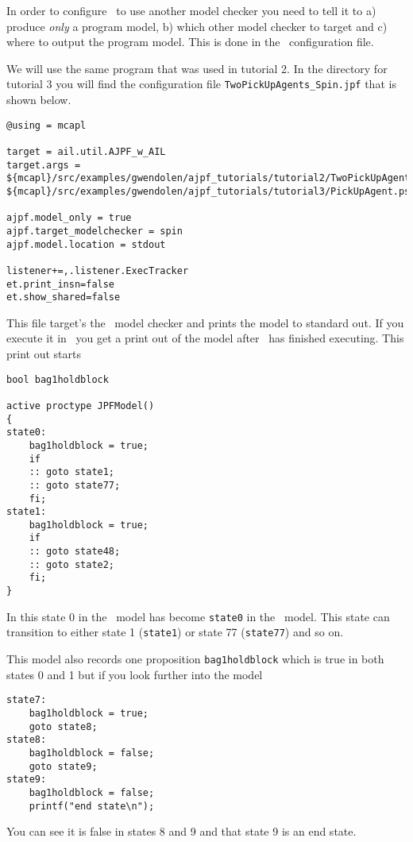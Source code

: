 \documentclass[a4]{article}
\begin{document}
In order to configure \ajpf\ to use another model checker you need to tell it to a) produce \emph{only} a program model, b) which other model checker to target and c) where to output the program model.  This is done in the \ajpf\ configuration file.  

We will use the same program that was used in tutorial 2.  In the directory for tutorial 3 you will find the configuration file \texttt{TwoPickUpAgents\_Spin.jpf} that is shown below.

\begin{verbatim}
@using = mcapl

target = ail.util.AJPF_w_AIL
target.args = ${mcapl}/src/examples/gwendolen/ajpf_tutorials/tutorial2/TwoPickUpAgents.ail,
${mcapl}/src/examples/gwendolen/ajpf_tutorials/tutorial3/PickUpAgent.psl,1

ajpf.model_only = true
ajpf.target_modelchecker = spin
ajpf.model.location = stdout

listener+=,.listener.ExecTracker
et.print_insn=false
et.show_shared=false
\end{verbatim}

This file target's the \spin\ model checker and prints the model to standard out.  If you execute it in \ajpf\ you get a print out of the model after \ajpf\  has finished executing.  This print out starts

\begin{verbatim}
bool bag1holdblock

active proctype JPFModel()
{
state0:
	bag1holdblock = true;
	if
	:: goto state1;
	:: goto state77;
	fi;
state1:
	bag1holdblock = true;
	if
	:: goto state48;
	:: goto state2;
	fi;
}
\end{verbatim}

In this state 0 in the \ajpf\ model has become \texttt{state0} in the \promela\ model.  This state can transition to either state 1 (\texttt{state1}) or state 77 (\texttt{state77}) and so on.

This model also records one proposition \texttt{bag1holdblock} which is true in both states 0 and 1 but if you look further into the model

\begin{verbatim}
state7:
	bag1holdblock = true;
	goto state8;
state8:
	bag1holdblock = false;
	goto state9;
state9:
	bag1holdblock = false;
	printf("end state\n");
\end{verbatim}

You can see it is false in states 8 and 9 and that state 9 is an end state.
\end{document}
